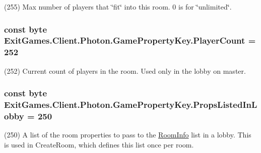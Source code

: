 (255) Max number of players that \char`\"{}fit\char`\"{} into this room. 0 is for \char`\"{}unlimited\char`\"{}.

\subsubsection[{\texorpdfstring{Player\+Count}{PlayerCount}}]{\setlength{\rightskip}{0pt plus 5cm}const byte Exit\+Games.\+Client.\+Photon.\+Game\+Property\+Key.\+Player\+Count = 252}\hypertarget{class_exit_games_1_1_client_1_1_photon_1_1_game_property_key_a6fdf48ff1a9e010809acc852a416fc7e}{}\label{class_exit_games_1_1_client_1_1_photon_1_1_game_property_key_a6fdf48ff1a9e010809acc852a416fc7e}


(252) Current count of players in the room. Used only in the lobby on master.

\subsubsection[{\texorpdfstring{Props\+Listed\+In\+Lobby}{PropsListedInLobby}}]{\setlength{\rightskip}{0pt plus 5cm}const byte Exit\+Games.\+Client.\+Photon.\+Game\+Property\+Key.\+Props\+Listed\+In\+Lobby = 250}\hypertarget{class_exit_games_1_1_client_1_1_photon_1_1_game_property_key_ae6a5330870a04b82f5acfe76ff067276}{}\label{class_exit_games_1_1_client_1_1_photon_1_1_game_property_key_ae6a5330870a04b82f5acfe76ff067276}


(250) A list of the room properties to pass to the \hyperlink{class_room_info}{Room\+Info} list in a lobby. This is used in Create\+Room, which defines this list once per room.

